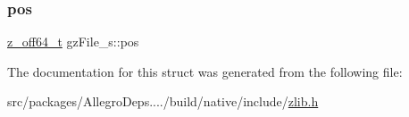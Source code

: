 \subsubsection{\texorpdfstring{pos}{pos}}
{\footnotesize\ttfamily \hyperlink{zconf_8h_ab9923767082c7a76924b31493e60d42c}{z\+\_\+off64\+\_\+t} gz\+File\+\_\+s\+::pos}



The documentation for this struct was generated from the following file\+:\begin{DoxyCompactItemize}
\item 
src/packages/\+Allegro\+Deps..../build/native/include/\hyperlink{zlib_8h}{zlib.\+h}\end{DoxyCompactItemize}
